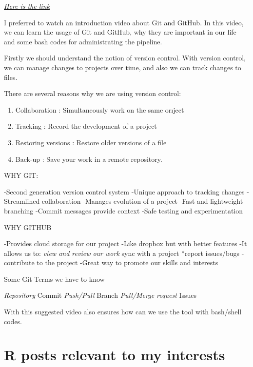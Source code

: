 \documentclass[
  letterpaper,
  DIV=11,
  numbers=noendperiod]{scrreprt}
\providecommand{\tightlist}{%
  \setlength{\itemsep}{0pt}\setlength{\parskip}{0pt}}\usepackage{longtable,booktabs,array}
\begin{document}
\href{https://www.youtube.com/watch?v=U186T7U08sA\&list=PL77T87Q0eoJhQDXzG2Viq3uHf5YyJfw0L\&index=5}{\emph{Here
is the link}}

I preferred to watch an introduction video about Git and GitHub. In this
video, we can learn the usage of Git and GitHub, why they are important
in our life and some bash codes for administrating the pipeline.

Firstly we should understand the notion of version control. With version
control, we can manage changes to projects over time, and also we can
track changes to files.

There are several reasons why we are using version control:

\begin{enumerate}
\def\labelenumi{\arabic{enumi})}
\tightlist
\item
  Collaboration : Simultaneously work on the same orıject
\item
  Tracking : Record the development of a project
\item
  Restoring versions : Restore older versions of a file
\item
  Back-up : Save your work in a remote repository.
\end{enumerate}

WHY GIT:

-Second generation version control system -Unique approach to tracking
changes -Streamlined collaboration -Manages evolution of a project -Fast
and lightweight branching -Commit messages provide context -Safe testing
and experimentation

WHY GITHUB

-Provides cloud storage for our project -Like dropbox but with better
features -It allows us to: \emph{view and review our work} sync with a
project *report issues/bugs -contribute to the project -Great way to
promote our skills and interests

Some Git Terms we have to know

\emph{Repository} Commit \emph{Push/Pull} Branch \emph{Pull/Merge
request} Issues

With this suggested video also ensures how can we use the tool with
bash/shell codes.

\hypertarget{r-posts-relevant-to-my-interests}{%
\section{R posts relevant to my
interests}\label{r-posts-relevant-to-my-interests}}
\end{document}
